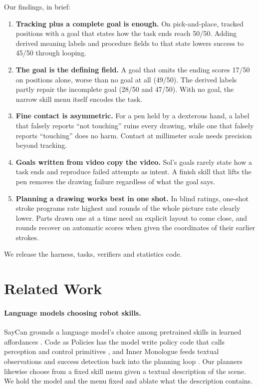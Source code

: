 \documentclass[11pt]{article}
\begin{document}
Our findings, in brief:
\begin{enumerate}
\item \textbf{Tracking plus a complete goal is enough.} On pick-and-place, tracked positions with a goal that states how the task ends reach 50/50. Adding derived meaning labels and procedure fields to that state lowers success to 45/50 through looping.
\item \textbf{The goal is the defining field.} A goal that omits the ending scores 17/50 on positions alone, worse than no goal at all (49/50). The derived labels partly repair the incomplete goal (28/50 and 47/50). With no goal, the narrow skill menu itself encodes the task.
\item \textbf{Fine contact is asymmetric.} For a pen held by a dexterous hand, a label that falsely reports ``not touching'' ruins every drawing, while one that falsely reports ``touching'' does no harm. Contact at millimeter scale needs precision beyond tracking.
\item \textbf{Goals written from video copy the video.} Sol's goals rarely state how a task ends and reproduce failed attempts as intent. A finish skill that lifts the pen removes the drawing failure regardless of what the goal says.
\item \textbf{Planning a drawing works best in one shot.} In blind ratings, one-shot stroke programs rate highest and rounds of the whole picture rate clearly lower. Parts drawn one at a time need an explicit layout to come close, and rounds recover on automatic scores when given the coordinates of their earlier strokes.
\end{enumerate}
We release the harness, tasks, verifiers and statistics code.

\section{Related Work}

\paragraph{Language models choosing robot skills.} SayCan grounds a language model's choice among pretrained skills in learned affordances \citep{saycan}. Code as Policies has the model write policy code that calls perception and control primitives \citep{cap}, and Inner Monologue feeds textual observations and success detection back into the planning loop \citep{innermonologue}. Our planners likewise choose from a fixed skill menu given a textual description of the scene. We hold the model and the menu fixed and ablate what the description contains.
\end{document}
